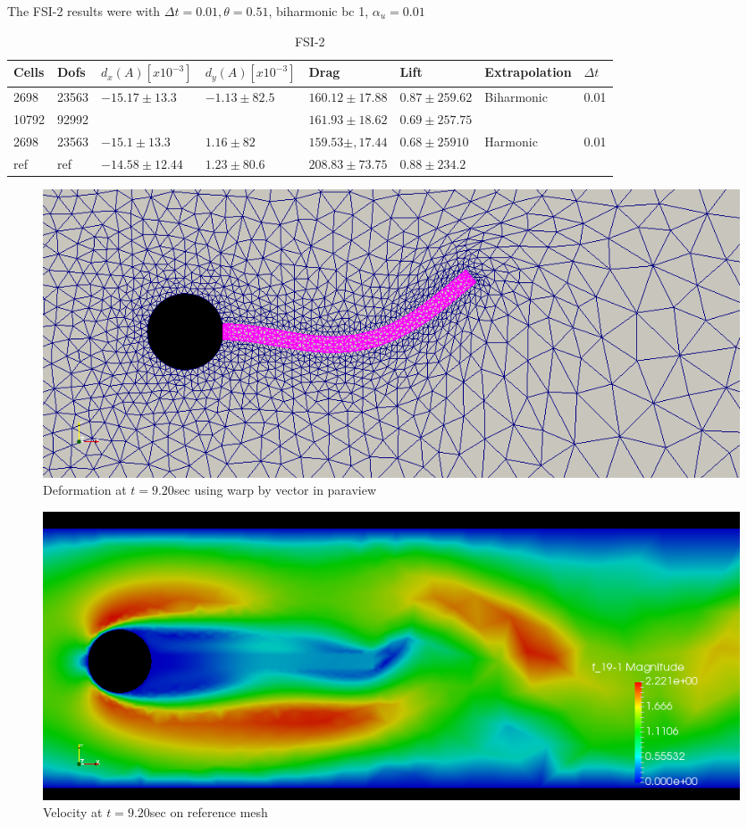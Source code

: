 The FSI-2 results were with $\Delta t = 0.01, \theta = 0.51$, biharmonic bc 1, $\alpha_u = 0.01$
\begin{table}[H]
\centering
\caption{FSI-2}
\begin{tabular}{|l|l|l|l|l|l|l|l|}
\hline
Cells & Dofs & $d_x(A) [x10^{-3}]$ & $d_y(A) [x10^{-3}]$ & Drag & Lift & Extrapolation & $\Delta t$ \\ \hline
2698 & 23563 & $-15.17 \pm 13.3  $ & $-1.13 \pm 82.5$ & $160.12 \pm 17.88$ & $0.87 \pm 259.62$ & Biharmonic & 0.01 \\ \hline
10792 & 92992 &  &  & $161.93 \pm 18.62$ & $0.69 \pm 257.75$ &  &  \\ \hline
2698 & 23563 & $-15.1 \pm 13.3 $ & $1.16 \pm 82 $ & $159.53 \pm,17.44 $ & $ 0.68 \pm 25910 $ & Harmonic & 0.01 \\ \hline
ref & ref & $-14.58 \pm 12.44$ & $1.23 \pm 80.6$ & $208.83 \pm 73.75  $ & $0.88 \pm 234.2 $ &  & \textbf{} \\ \hline
\end{tabular}
\end{table}



\begin{figure}[H]
\caption{Deformation at $t =9.20 $sec  using warp by vector in paraview}
\includegraphics[scale=0.40,trim={0mm 0mm 0mm 0mm},clip]{./Verification_Validation/Hron_Turek/FSI2_d_920.png}
\end{figure}
\begin{figure}[H]
\caption{Velocity at $ t = 9.20 $sec on reference mesh}
\includegraphics[scale=0.40,trim={0mm 0mm 0mm 0mm},clip]{./Verification_Validation/Hron_Turek/FSI2_u_920.png}
\end{figure}










